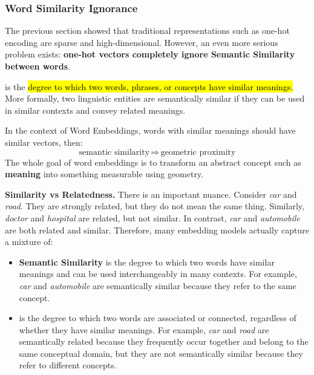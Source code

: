 \subsubsection{Word Similarity Ignorance}\label{sec:word-similarity-ignorance}

The previous section showed that traditional representations such as one-hot encoding are sparse and high-dimensional. However, an even more serious problem exists: \textbf{one-hot vectors completely ignore Semantic Similarity between words}.

\highspace
\begin{definitionbox}\label{def:semantic-similarity}
     is the \hl{degree to which two words, phrases, or concepts have similar meanings.} More formally, two linguistic entities are semantically similar if they can be used in similar contexts and convey related meanings. 

    \highspace
    In the context of Word Embeddings, words with similar meanings should have similar vectors, then:
    \begin{equation*}
        \text{semantic similarity} \, \Rightarrow \, \text{geometric proximity}
    \end{equation*}
    The whole goal of word embeddings is to transform an abstract concept such as \textbf{meaning} into something measurable using geometry.

    \highspace
    \textcolor{Red2}{ \textbf{Similarity vs Relatedness.}} There is an important nuance. Consider \emph{car} and \emph{road}. They are strongly related, but they do not mean the same thing. Similarly, \emph{doctor} and \emph{hospital} are related, but not similar. In contrast, \emph{car} and \emph{automobile} are both related and similar. Therefore, many embedding models actually capture a mixture of:
    \begin{itemize}
        \item \textbf{Semantic Similarity} is the degree to which two words have similar meanings and can be used interchangeably in many contexts. For example, \emph{car} and \emph{automobile} are semantically similar because they refer to the same concept.
        \item {} is the degree to which two words are associated or connected, regardless of whether they have similar meanings. For example, \emph{car} and \emph{road} are semantically related because they frequently occur together and belong to the same conceptual domain, but they are not semantically similar because they refer to different concepts.
    \end{itemize}
\end{definitionbox}

